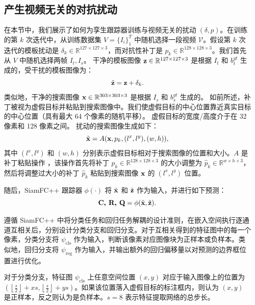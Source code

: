\subsection{产生视频无关的对抗扰动}
在本节中，我们展示了如何为孪生跟踪器训练与视频无关的扰动 $(\delta, p)$。在训练的第 $k$ 次迭代中，从训练数据集 $V=\{I_i\}_1^T$ 中随机选择一段视频 $\mathcal V$。假设第 $k$ 次迭代的模板扰动是 $\delta_k \in \mathbb{R}^{127\times 127 \times 3}$，而对抗性补丁是 $p_k \in \mathbb{R}^{128\times 128\times 3}$。我们首先从 $V$ 中随机选择两帧 $I_t, I_s$。
干净的模板图像 $\textbf z\in \mathbb{R}^{127\times 127 \times 3}$ 是根据 $I_t$ 和 $b^{gt}_t$ 生成的，受干扰的模板图像为：
\begin{equation}
\tilde {\textbf z} = \textbf z + \delta_k.
\end{equation}
类似地，干净的搜索图像 $\textbf x \in \mathbb{R}^{303\times 303 \times 3}$ 是根据 $I_s$ 和 $b^{gt}_s$ 生成的。
如前所述，补丁被视为虚假目标并粘贴到搜索图像中。我们使虚假目标的中心位置靠近真实目标的中心位置（具有最大 64 个像素的随机平移）。
虚假目标的宽度/高度介于在 32 像素和 128 像素之间。
扰动的搜索图像生成如下：
\begin{equation}
\tilde{\textbf x} = A(\textbf x, p_k, (l^x, l^y), (w, h)),
\end{equation}
其中 $(l^x, l^y)$ 和 $(w, h)$ 分别表示虚假目标相对于搜索图像的位置和大小。$A$ 是补丁粘贴操作 \cite{patch}，该操作首先将补丁 $p_k \in \mathbb{R}^{128\times 128\times 3}$ 的大小调整为 $\hat{p}_k \in \mathbb{R}^{w\times h\times 3}$，然后将调整过大小的补丁 $\hat{p}_k$ 粘贴到搜索图像 $\textbf x$ 的 $(l^x,l^y)$ 位置。

随后，SiamFC++ 跟踪器 $\phi(\cdot)$ 将 $\tilde {\textbf x}$ 和 $\tilde{\textbf z}$ 作为输入，并进行如下预测：
\begin{equation}
\textbf{C, R, Q} = \phi(\tilde {\textbf x}, \tilde{\textbf z}).
\end{equation}

遵循 SiamFC++ \cite{SiamFC++} 中将分类任务和回归任务解耦的设计准则，在嵌入空间执行逐通道互相关后，分别设计分类分支和回归分支。对于互相关得到的特征图中的每一个像素，分类分支将 $\psi_{\mathrm{cls}}$ 作为输入，判断该像素对应图像块为正样本或负样本。类似地，回归分支将 $\psi_{\mathrm{reg}}$ 作为输入，并输出额外的回归偏移量以对预测的边界框位置进行优化。

对于分类分支，特征图 $\psi_{\mathrm{cls}}$ 上任意空间位置 $(x,y)$ 对应于输入图像上的位置为 $\left(\left\lfloor\frac{s}{2}\right\rfloor+x s,\left\lfloor\frac{s}{2}\right\rfloor+y s\right)$。如果该位置落入虚假目标的标注框内，则认为 $(x,y)$ 是正样本，反之则认为是负样本。$s=8$ 表示特征提取网络的总步长。

